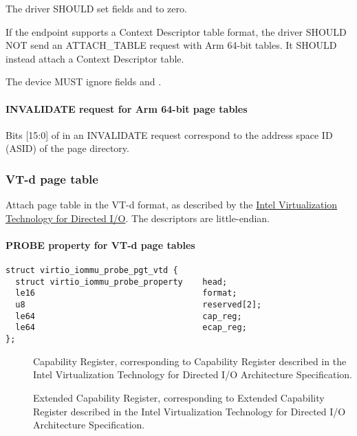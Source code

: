 
The driver SHOULD set fields  and
 to zero.

If the endpoint supports a Context Descriptor table format, the
driver SHOULD NOT send an ATTACH_TABLE request with Arm 64-bit
tables. It SHOULD instead attach a Context Descriptor table.


The device MUST ignore fields  and
.

\paragraph{INVALIDATE request for Arm 64-bit page tables}\label{sec:Device Types / IOMMU Device / Table Formats / Arm64 / INVALIDATE}

Bits [15:0] of  in an INVALIDATE request correspond to
the address space ID (ASID) of the page directory.

\subsubsection{VT-d page table}\label{sec:Device Types / IOMMU Device / Table Formats / VT-d}
Attach page table in the VT-d format, as described by the \hyperref[intro:VT-Directed-IO]
{Intel Virtualization Technology for Directed I/O}. The descriptors
are little-endian.

\paragraph{PROBE property for VT-d page tables}\label{sec:Device Types / IOMMU Device / Table Formats / VT-d / PROBE}

\begin{lstlisting}
struct virtio_iommu_probe_pgt_vtd {
  struct virtio_iommu_probe_property    head;
  le16                                  format;
  u8                                    reserved[2];
  le64                                  cap_reg;
  le64                                  ecap_reg;
};
\end{lstlisting}

\begin{description}
  \item[] Capability Register, corresponding to
    Capability Register described in the Intel Virtualization
    Technology for Directed I/O Architecture Specification.
  \item[] Extended Capability Register,
    corresponding to Extended Capability Register described in
    the Intel Virtualization Technology for Directed I/O
    Architecture Specification.
\end{description}

